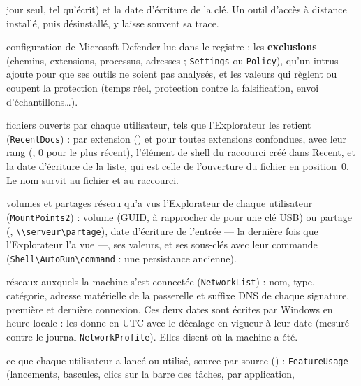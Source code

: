 \documentclass[11pt,a4paper,oneside]{report}
\begin{document}
\begin{description}[style=nextline,leftmargin=1.2em]
        jour seul, tel qu'écrit) et la date d'écriture de la clé. Un outil
        d'accès à distance installé, puis désinstallé, y laisse souvent sa trace.
  \item[\fichier{defender\_configuration.json}] configuration de Microsoft
        Defender lue dans le registre : les \textbf{exclusions} (chemins,
        extensions, processus, adresses ;  \texttt{Settings} ou
        \texttt{Policy}), qu'un intrus ajoute pour que ses outils ne soient pas
        analysés, et les valeurs qui règlent ou coupent la protection (temps
        réel, protection contre la falsification, envoi d'échantillons\ldots).
  \item[\fichier{explorer\_recent\_docs.json}] fichiers ouverts par chaque
        utilisateur, tels que l'Explorateur les retient (\texttt{RecentDocs}) :
        par extension () et pour toutes extensions confondues,
        avec leur rang (, 0 pour le plus récent), l'élément de
        shell du raccourci créé dans Recent, et la date d'écriture de la liste,
        qui est celle de l'ouverture du fichier en position~0. Le nom survit au
        fichier et au raccourci.
  \item[\fichier{mount\_points.json}] volumes et partages réseau qu'a vus
        l'Explorateur de chaque utilisateur (\texttt{MountPoints2}) : volume
        (GUID, à rapprocher de  pour une clé USB)
        ou partage (, \texttt{\textbackslash\textbackslash serveur\textbackslash partage}),
        date d'écriture de l'entrée --- la dernière fois que l'Explorateur l'a
        vue ---, ses valeurs, et ses sous-clés avec leur commande
        (\texttt{Shell\textbackslash AutoRun\textbackslash command} : une
        persistance ancienne).
  \item[\fichier{known\_networks.json}] réseaux auxquels la machine s'est
        connectée (\texttt{NetworkList}) : nom, type, catégorie, adresse
        matérielle de la passerelle et suffixe DNS de chaque signature, première
        et dernière connexion. Ces deux dates sont écrites par Windows en heure
        locale : \wac{} les donne en UTC avec le décalage en vigueur à leur
        date (mesuré contre le journal \texttt{NetworkProfile}). Elles disent où
        la machine a été.
  \item[\fichier{program\_usage.json}] ce que chaque utilisateur a lancé ou
        utilisé, source par source () : \texttt{FeatureUsage}
        (lancements, bascules, clics sur la barre des tâches, par application,

\end{description}
\end{document}
